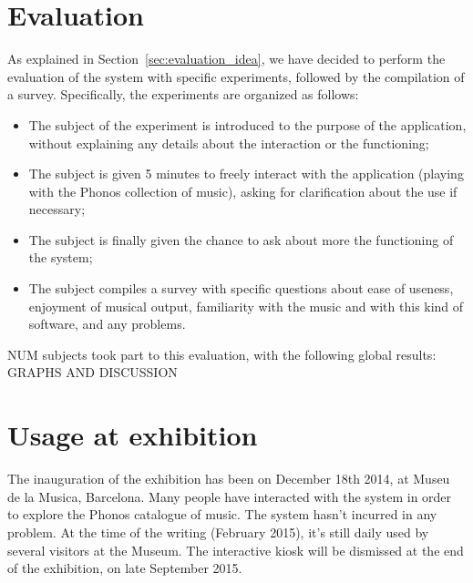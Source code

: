 \section{Evaluation}
\label{sec:eval_results}
As explained in Section~\ref{sec:evaluation_idea}, we have decided to perform the evaluation of the system with specific experiments, followed by the compilation of a survey.
Specifically, the experiments are organized as follows:
\begin{itemize}
\item The subject of the experiment is introduced to the purpose of the application, without explaining any details about the interaction or the functioning;
\item The subject is given 5 minutes to freely interact with the application (playing with the Phonos collection of music), asking for clarification about the use if necessary;
\item The subject is finally given the chance to ask about more the functioning of the system;
\item The subject compiles a survey with specific questions about ease of useness, enjoyment of musical output, familiarity with the music and with this kind of software, and any problems. 
\end{itemize}

NUM subjects took part to this evaluation, with the following global results: \\
GRAPHS AND DISCUSSION

\section{Usage at exhibition} 
The inauguration of the exhibition has been on December 18th 2014, at Museu de la Musica, Barcelona. Many people have interacted with the system in order to explore the Phonos catalogue of music. The system hasn't incurred in any problem. At the time of the writing (February 2015), it's still daily used by several visitors at the Museum. The interactive kiosk will be dismissed at the end of the exhibition, on late September 2015.\\

